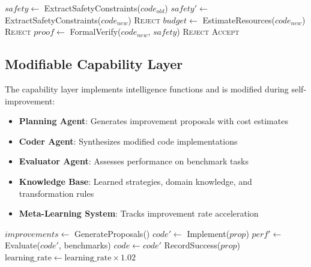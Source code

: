 \documentclass[11pt,letterpaper]{article}
\begin{document}
\begin{algorithm}
\caption{Safety Layer Verification}
\begin{algorithmic}[1]
    \State $safety \gets$ ExtractSafetyConstraints($code_{old}$)
    \State $safety' \gets$ ExtractSafetyConstraints($code_{new}$)
        \State \Return \textsc{Reject} 
    \EndIf
    \State $budget \gets$ EstimateResources($code_{new}$)
        \State \Return \textsc{Reject} 
    \EndIf
    \State $proof \gets$ FormalVerify($code_{new}$, $safety$)
        \State \Return \textsc{Reject} 
    \EndIf
    \State \Return \textsc{Accept}
\EndProcedure
\end{algorithmic}
\end{algorithm}

\subsection{Modifiable Capability Layer}

The capability layer implements intelligence functions and is modified during self-improvement:

\begin{itemize}
\item \textbf{Planning Agent}: Generates improvement proposals with cost estimates
\item \textbf{Coder Agent}: Synthesizes modified code implementations
\item \textbf{Evaluator Agent}: Assesses performance on benchmark tasks
\item \textbf{Knowledge Base}: Learned strategies, domain knowledge, and transformation rules
\item \textbf{Meta-Learning System}: Tracks improvement rate acceleration
\end{itemize}

\begin{algorithm}
\caption{Recursive Self-Improvement}
\begin{algorithmic}[1]
    \State $improvements \gets$ GenerateProposals()
        \State $code' \gets$ Implement($prop$)
            \State $perf' \gets$ Evaluate($code'$, benchmarks)
                \State $code \gets code'$ 
                \State RecordSuccess($prop$)
            \EndIf
        \EndIf
    \EndFor
    \State $\text{learning\_rate} \gets \text{learning\_rate} \times 1.02$ 
\EndProcedure
\end{algorithmic}
\end{algorithm}
\end{document}
